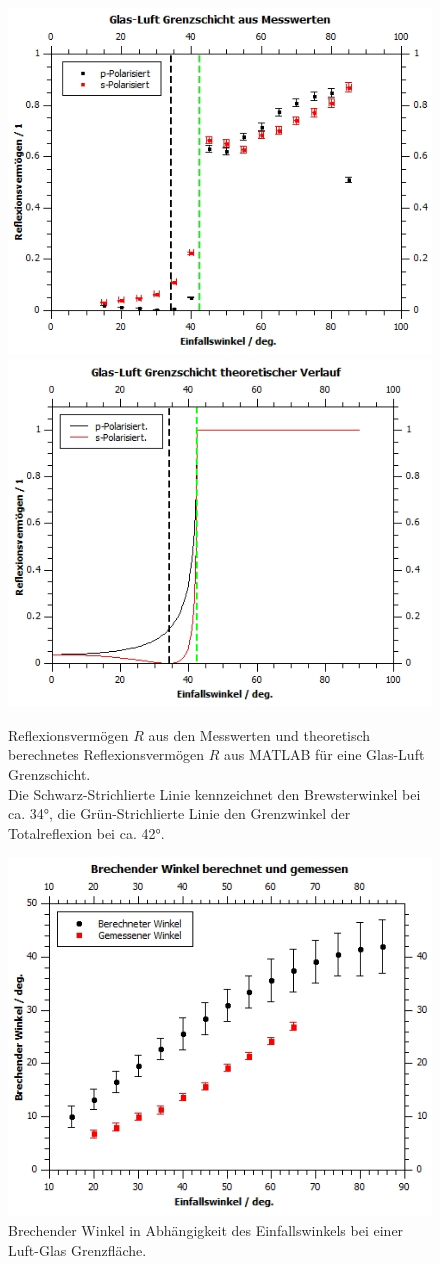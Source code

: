 \documentclass[12pt,a4paper,twoside]{article}
\begin{document}
\begin{figure}[H]
    \centering
    \includegraphics[width=0.6\linewidth]{nudes/GL Mess.jpg}
    \includegraphics[width=0.6\linewidth]{nudes/GL theor.jpg}
    \caption{Reflexionsvermögen $R$ aus den Messwerten und theoretisch berechnetes Reflexionsvermögen $R$ aus MATLAB für eine Glas-Luft Grenzschicht. \\
    Die Schwarz-Strichlierte Linie kennzeichnet den Brewsterwinkel bei ca. 34°, die Grün-Strichlierte Linie den Grenzwinkel der Totalreflexion bei ca. 42°. }
    \label{fig:zus reflexionsvermögen GL}
\end{figure}

\begin{figure}[H]
    \centering
    \includegraphics[width=0.6\linewidth]{nudes/brechender winkel.jpg}
    \caption{Brechender Winkel in Abhängigkeit des Einfallswinkels bei einer Luft-Glas Grenzfläche. }
    \label{fig:zus brechender winkel}
\end{figure}
\end{document}
